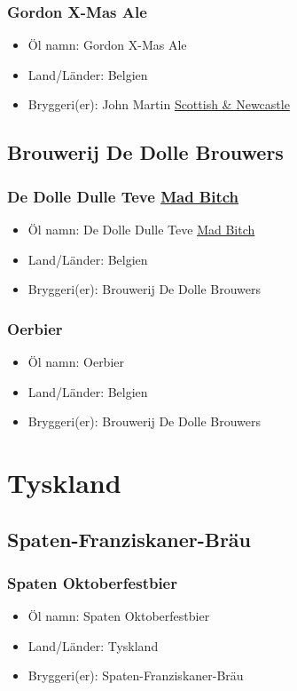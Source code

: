 \documentclass[11pt]{article}
\begin{document}
\subsubsection{Gordon X-Mas Ale}
\label{sec:orged54cd6}
\begin{itemize}
\item Öl namn: Gordon X-Mas Ale
\item Land/Länder: Belgien
\item Bryggeri(er): John Martin \uline{Scottish \& Newcastle}
\end{itemize}
\subsection{Brouwerij De Dolle Brouwers}
\label{sec:org4ad22a1}
\subsubsection{De Dolle Dulle Teve \underline{Mad Bitch}}
\label{sec:orgd733e5e}
\begin{itemize}
\item Öl namn: De Dolle Dulle Teve \uline{Mad Bitch}
\item Land/Länder: Belgien
\item Bryggeri(er): Brouwerij De Dolle Brouwers
\end{itemize}
\subsubsection{Oerbier}
\label{sec:orga24b399}
\begin{itemize}
\item Öl namn: Oerbier
\item Land/Länder: Belgien
\item Bryggeri(er): Brouwerij De Dolle Brouwers
\end{itemize}
\section{Tyskland}
\label{sec:org2d7725b}
\subsection{Spaten-Franziskaner-Bräu}
\label{sec:org73bbf8f}
\subsubsection{Spaten Oktoberfestbier}
\label{sec:orga19e568}
\begin{itemize}
\item Öl namn: Spaten Oktoberfestbier
\item Land/Länder: Tyskland
\item Bryggeri(er): Spaten-Franziskaner-Bräu
\end{itemize}
\end{document}
